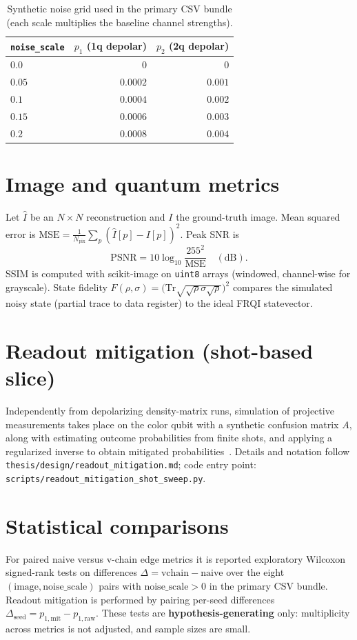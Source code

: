 \begin{table}[htbp]
\centering
\caption{Synthetic noise grid used in the primary CSV bundle (each scale multiplies the baseline channel strengths).}
\label{tab:noise-grid}
\begin{tabular}{lrr}
\toprule
\texttt{noise\_scale} & $p_1$ (1q depolar) & $p_2$ (2q depolar) \\
\midrule
$0.0$ & $0$ & $0$ \\
$0.05$ & $0.0002$ & $0.001$ \\
$0.1$ & $0.0004$ & $0.002$ \\
$0.15$ & $0.0006$ & $0.003$ \\
$0.2$ & $0.0008$ & $0.004$ \\
\bottomrule
\end{tabular}
\end{table}

\section{Image and quantum metrics}
Let $\hat{I}$ be an $N\times N$ reconstruction and $I$ the ground-truth image. Mean squared error is $\mathrm{MSE}=\frac{1}{N_{\mathrm{pix}}}\sum_p (\hat{I}[p]-I[p])^2$. Peak SNR is
\begin{equation}
\mathrm{PSNR} = 10\log_{10}\frac{255^2}{\mathrm{MSE}} \quad (\mathrm{dB}) .
\end{equation}
SSIM is computed with scikit-image on \texttt{uint8} arrays (windowed, channel-wise for grayscale). State fidelity $F(\rho,\sigma)=\bigl(\mathrm{Tr}\sqrt{\sqrt{\rho}\sigma\sqrt{\rho}}\bigr)^2$ compares the simulated noisy state (partial trace to data register) to the ideal FRQI statevector.

\section{Readout mitigation (shot-based slice)}
Independently from depolarizing density-matrix runs, simulation of projective measurements takes place on the color qubit with a synthetic confusion matrix $A$, along with estimating outcome probabilities from finite shots, and applying a regularized inverse to obtain mitigated probabilities~\cite{Mu2025GuidedImageFiltering}. Details and notation follow \texttt{thesis/design/readout\_mitigation.md}; code entry point: \texttt{scripts/readout\_mitigation\_shot\_sweep.py}.

\section{Statistical comparisons}
For paired naive versus v-chain edge metrics it is reported exploratory Wilcoxon signed-rank tests on differences $\Delta = \mathrm{vchain}-\mathrm{naive}$ over the eight $(\mathrm{image},\mathrm{noise\_scale})$ pairs with $\mathrm{noise\_scale}>0$ in the primary CSV bundle. Readout mitigation is performed by pairing per-seed differences $\Delta_{\mathrm{seed}} = p_{1,\mathrm{mit}}-p_{1,\mathrm{raw}}$. These tests are \textbf{hypothesis-generating} only: multiplicity across metrics is not adjusted, and sample sizes are small.

